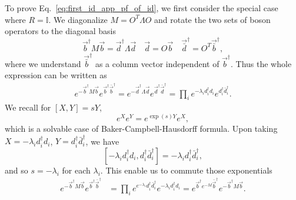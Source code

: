 To prove Eq.~\eqref{eq:first_id_app_pf_of_id}, we first consider the special case where $R=\mathbb{I}$. We diagonalize $M = O^{T} \Lambda O $ and rotate the two sets of boson operators to the diagonal basis
\begin{equation}
  \vec{b}^{\dagger}  M \vec{b} = \vec{d}^{\dagger} \Lambda \vec{d}  \quad \vec{d} = O \vec{b} \quad \vec{\bar{d}}^\dagger = O^T \vec{\bar{b}}^\dagger,
\end{equation}
where we understand $\vec{\bar{b}}^\dagger$ as a column vector independent of $\vec{{b}}^\dagger$. Thus the whole expression can be written as
\begin{equation}
\begin{aligned}
  e^{- \vec{b}^{\dagger} M \vec{b} } e^{ \vec{b}^{\dagger} \bar{\vec{b}}^\dagger }  =  
  e^{- \vec{d}^{\dagger} \Lambda \vec{d} } e^{   \vec{d}^{\dagger} \bar{\vec{d}}^\dagger } = \prod_i  e^{- \lambda_i d_i^{\dagger} d_i } e^{  d_i^{\dagger} \bar{d}_i ^{\dagger} }.
\end{aligned}
\end{equation}
We recall for $ [X, Y] = sY $, 
\begin{equation}
  e^X e^{Y} = e^{\exp (s ) Y} e^{X},
\end{equation}
which is a solvable case of Baker-Campbell-Hausdorff formula. Upon taking $X = -\lambda_i d_i^{\dagger} d_i$, $Y = d_i^{\dagger} \bar{d}^{\dagger}_i$, we have
\begin{equation}
\label{eq:lambda_commutator}
[- \lambda_i d_i^{\dagger} d_i, d_i ^{\dagger} \bar{d}_i^{\dagger}] =  - \lambda_i  d_i ^{\dagger} \bar{d}_i^{\dagger} ,
\end{equation}
and so $s = - \lambda_i$ for each $\lambda_i$. This enable us to commute those exponentials
\begin{equation}
\begin{aligned}
e^{- \vec{b}^{\dagger} M \vec{b} } e^{  \vec{b}^{\dagger} \bar{\vec{b}}^\dagger }   &= \prod_i e^{ e^{- \lambda_i }  d^{\dagger}_i \bar{d}^{\dagger}_i }  e^{-\lambda_i  d^{\dagger}_i d_i }  = e^{ \vec{b}^{\dagger} e^{-M}  \bar{\vec{b}}^\dagger} e^{- \vec{b}^{\dagger} M \vec{b} }. 
\end{aligned}
\end{equation}
